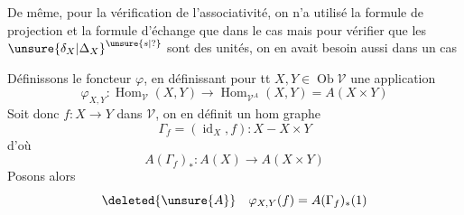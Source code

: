 De même, pour la  vérification de l'associativité,
on n'a utilisé la formule de projection et la
formule d'échange que dans le cas
mais pour vérifier que les $\unsure{\delta_X|\Delta_X}^{\unsure{s|?}}$ sont des
unités, on en avait besoin aussi dans un cas


Définissons le foncteur $\varphi$, en définissant pour
tt $X,Y\in\operatorname{Ob}\mathcal V$ une application
\[
\varphi_{X,Y}:\operatorname{Hom}_{\mathcal V}(X,Y)\longrightarrow
\operatorname{Hom}_{\mathcal V^A}(X,Y)=A(X\times Y)
\]
Soit donc $f:X\longrightarrow Y$ dans $\mathcal V$, on en définit
un hom graphe
\[
\Gamma_f=(\operatorname{id}_X,f):X-X\times Y
\]
d'où
\[
A(\Gamma_f)_*:A(X)\longrightarrow A(X\times Y)
\]
Posons alors
\[
\deleted{\unsure{A}}\quad\varphi_{X,Y}(f)=A(\Gamma_f)_*(1)
\]
